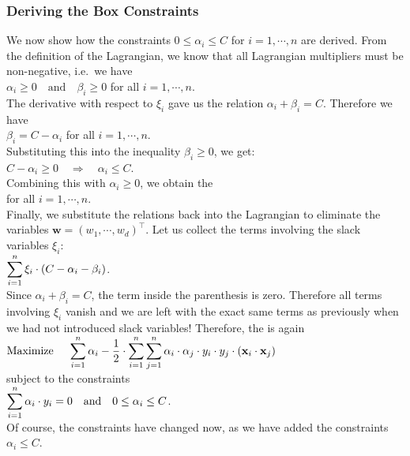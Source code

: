 \subsubsection{Deriving the Box Constraints}
We now show how the constraints $0 \leq \alpha_i \leq C$ for $i=1,\cdots,n$ are derived.
From the definition of the Lagrangian, we know that all Lagrangian multipliers must be non-negative, i.e.~we
have 
\\[0.2cm]
\hspace*{1.3cm}
$\alpha_i \geq 0 \quad \text{and} \quad \beta_i \geq 0$ \quad for all $i=1,\cdots,n$.
\\[0.2cm]
The derivative with respect to $\xi_i$ gave us the relation $\alpha_i + \beta_i = C$.  Therefore we have
\\[0.2cm]
\hspace*{1.3cm}
$\beta_i = C - \alpha_i$ \quad for all $i=1,\cdots,n$.
\\[0.2cm]
Substituting this into the inequality $\beta_i \geq 0$, we get:
\\[0.2cm]
\hspace*{1.3cm}
$C - \alpha_i \geq 0 \quad \Rightarrow \quad \alpha_i \leq C$.
\\[0.2cm]
Combining this with $\alpha_i \geq 0$, we obtain the 
\\[0.2cm]
\hspace*{1.3cm}
\colorbox{red}{} \quad for all $i=1,\cdots,n$.
\\[0.2cm]
Finally, we substitute the relations back into the Lagrangian to eliminate the variables
$\mathbf{w} = (w_1,\cdots, w_d)^\top$.
Let us collect the terms involving the slack variables $\xi_i$:
\\[0.2cm]
\hspace*{1.3cm}
$\displaystyle \sum_{i=1}^n \xi_i \cdot (C - \alpha_i - \beta_i)$.
\\[0.2cm]
Since $\alpha_i + \beta_i = C$, the term inside the parenthesis is zero.  Therefore all terms involving $\xi_i$ vanish
and we are left with the exact same terms as previously when we had not introduced slack variables!
Therefore, the  is again
\\[0.2cm]
\hspace*{1.3cm}
$\displaystyle \text{Maximize } \quad \sum_{i=1}^n \alpha_i - \frac{1}{2}
 \cdot\sum_{i=1}^n \sum_{j=1}^n \alpha_i \cdot\alpha_j\cdot y_i\cdot y_j \cdot (\mathbf{x}_i \cdot \mathbf{x}_j)$
\\[0.2cm]
subject to the constraints
\\[0.2cm]
\hspace*{1.3cm}
$\displaystyle \sum_{i=1}^n \alpha_i \cdot y_i = 0 \quad \text{and} \quad 0 \leq \alpha_i \leq C$.
\\[0.2cm]
Of course, the constraints have changed now, as we have added the constraints $\alpha_i \leq C$.

